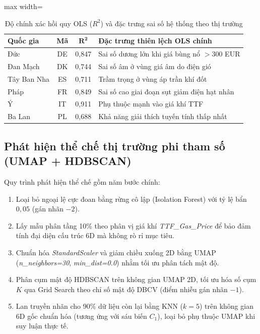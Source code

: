 \begin{table}[h]
  \centering
  \caption{Độ chính xác hồi quy OLS ($R^2$) và đặc trưng sai số hệ thống theo thị trường}
  \label{tab:ols_accuracy}
  \begin{adjustbox}{max width=\columnwidth}
  \begin{tabular}{@{}lccl@{}}
    \toprule
    \textbf{Quốc gia} & \textbf{Mã} & $\mathbf{R^2}$ & \textbf{Đặc trưng thiên lệch OLS chính} \\
    \midrule
    Đức & DE & 0,847 & Sai số dương lớn khi giá bùng nổ $>$300 EUR \\
    Đan Mạch & DK & 0,744 & Sai số âm ở vùng giá âm do điện gió \\
    Tây Ban Nha & ES & 0,711 & Trầm trọng ở vùng áp trần khí đốt \\
    Pháp & FR & 0,849 & Sai số cao giai đoạn sụt giảm điện hạt nhân \\
    Ý & IT & 0,911 & Phụ thuộc mạnh vào giá khí TTF \\
    Ba Lan & PL & 0,688 & Khả năng giải thích tuyến tính thấp nhất \\
    \bottomrule
  \end{tabular}
  \end{adjustbox}
\end{table}

\subsection{Phát hiện thể chế thị trường phi tham số (UMAP + HDBSCAN)}
\label{subsec:hdbscan}

Quy trình phát hiện thể chế gồm năm bước chính:
\begin{enumerate}[noitemsep, topsep=2pt, parsep=2pt]
  \item Loại bỏ ngoại lệ cực đoan bằng rừng cô lập (Isolation Forest) với tỷ lệ bẩn $0,05$ (gán nhãn $-2$).
  \item Lấy mẫu phân tầng 10\% theo phân vị giá khí \textit{TTF\_Gas\_Price} để bảo đảm tính đại diện cấu trúc 6D mà không rò rỉ mục tiêu.
  \item Chuẩn hóa \textit{StandardScaler} và giảm chiều xuống 2D bằng UMAP (\textit{n\_neighbors=30}, \textit{min\_dist=0.0}) nhằm tối ưu phân tách mật độ.
  \item Phân cụm mật độ HDBSCAN trên không gian UMAP 2D, tối ưu hóa số cụm $K$ qua Grid Search theo chỉ số mật độ DBCV (điểm nhiễu gán nhãn $-1$).
  \item Lan truyền nhãn cho 90\% dữ liệu còn lại bằng KNN ($k=5$) trên không gian 6D gốc chuẩn hóa (tương ứng với sáu biến $C_1$), loại bỏ phụ thuộc UMAP khi suy luận thực tế.
\end{enumerate}

